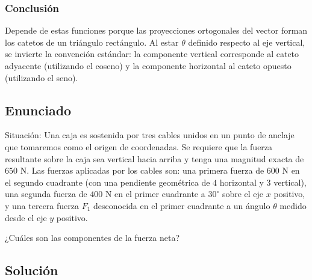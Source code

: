 \documentclass[12pt, a4paper]{article}
\begin{document}
\subsubsection*{Conclusión}
Depende de estas funciones porque las proyecciones ortogonales del vector forman los catetos de un triángulo rectángulo. Al estar $\theta$ definido respecto al eje vertical, se invierte la convención estándar: la componente vertical corresponde al cateto adyacente (utilizando el coseno) y la componente horizontal al cateto opuesto (utilizando el seno).

\newpage
\subsection*{Enunciado}
Situación: Una caja es sostenida por tres cables unidos en un punto de anclaje que tomaremos como el origen de coordenadas. Se requiere que la fuerza resultante sobre la caja sea vertical hacia arriba y tenga una magnitud exacta de $650 \text{ N}$. Las fuerzas aplicadas por los cables son: una primera fuerza de $600 \text{ N}$ en el segundo cuadrante (con una pendiente geométrica de $4$ horizontal y $3$ vertical), una segunda fuerza de $400 \text{ N}$ en el primer cuadrante a $30^\circ$ sobre el eje $x$ positivo, y una tercera fuerza $F_1$ desconocida en el primer cuadrante a un ángulo $\theta$ medido desde el eje $y$ positivo.

\begin{center}
\end{center}

¿Cuáles son las componentes de la fuerza neta?

\subsection*{Solución}
\end{document}
